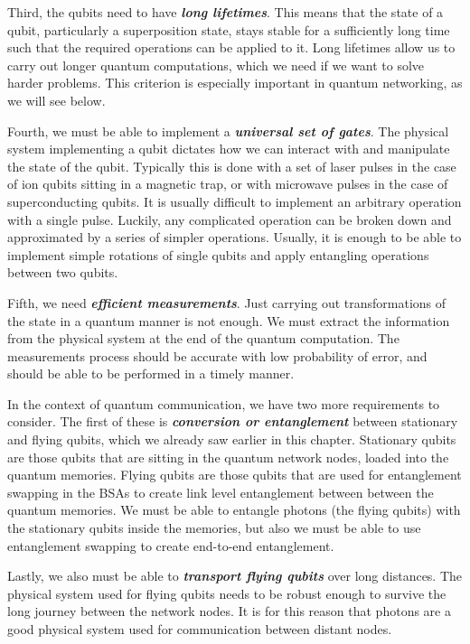 Third, the qubits need to have \textbf{\emph{long lifetimes}}. This means that the state of a qubit, particularly a superposition state, stays stable for a sufficiently long time such that the required operations can be applied to it.
Long lifetimes allow us to carry out longer quantum computations, which we need if we want to solve harder problems.
This criterion is especially important in quantum networking, as we will see below.

Fourth, we must be able to implement a \textbf{\emph{universal set of gates}}.
The physical system implementing a qubit dictates how we can interact with and manipulate the state of the qubit.
Typically this is done with a set of laser pulses in the case of ion qubits sitting in a magnetic trap, or with microwave pulses in the case of superconducting qubits.
It is usually difficult to implement an arbitrary operation with a single pulse.
Luckily, any complicated operation can be broken down and approximated by a series of simpler operations.
Usually, it is enough to be able to implement simple rotations of single qubits and apply entangling operations between two qubits.

Fifth, we need \textbf{\emph{efficient measurements}}.
Just carrying out transformations of the state in a quantum manner is not enough.
We must extract the information from the physical system at the end of the quantum computation.
The measurements process should be accurate with low probability of error, and should be able to be performed in a timely manner.

In the context of quantum communication, we have two more requirements to consider.
The first of these is \textbf{\emph{conversion or entanglement }}between stationary and flying qubits, which we already saw earlier in this chapter.
Stationary qubits are those qubits that are sitting in the quantum network nodes, loaded into the quantum memories. 
Flying qubits are those qubits that are used for entanglement swapping in the BSAs to create link level entanglement between between the quantum memories.
We must be able to entangle photons (the flying qubits) with the stationary qubits inside the memories, but also we must be able to use entanglement swapping to create end-to-end entanglement.

Lastly, we also must be able to \textbf{\emph{transport flying qubits}} over long distances.
The physical system used for flying qubits needs to be robust enough to survive the long journey between the network nodes.
It is for this reason that photons are a good physical system used for communication between distant nodes.


